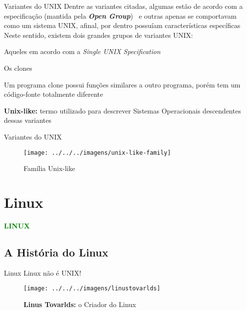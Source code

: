 \documentclass{beamer}
\begin{document}
    \begin{frame}[t]{Variantes do UNIX}
      Dentre as variantes citadas, algumas estão de acordo com a especificação (mantida pela \textbf{\textit{Open Group}}) \
      e outras apenas se comportavam como um sistema UNIX, afinal, por dentro possuíam características específicas \\
      \vspace{\baselineskip}
      \uncover<2->
      {Neste sentido, existem dois grandes grupos de variantes UNIX:}
      \begin{itemize}
        {\item Aqueles em acordo com a \textit{Single UNIX Specification}}
	\uncover<4->
	{\item Os clones}
	\begin{itemize}
	  \vspace{\baselineskip}
	  {\item Um programa clone possui funções similares a outro programa, porém tem um código-fonte totalmente diferente}
	\end{itemize}
      \end{itemize}
      \vspace{\baselineskip}
      {\textbf{Unix-like:} termo utilizado para descrever Sistemas Operacionais descendentes dessas variantes}
   \end{frame}

   \begin{frame}[t]{Variantes do UNIX}
      \begin{figure}
	\texttt{[image: ../../../imagens/unix-like-family]}
	\caption{Família Unix-like} 
      \end{figure}
   \end{frame}

\section{Linux}
  \begin{frame}
     \begin{center}
        \Large{\textcolor{green}{\textbf{LINUX}}}
     \end{center}
   \end{frame}
  \subsection{A História do Linux}
   \begin{frame}{Linux}
      \alert{Li}nux \alert{n}ão é \alert{U}NI\alert{X}!
      \centering
      \begin{figure}
	\texttt{[image: ../../../imagens/linustovarlds]}
	\caption{\textbf{Linus Tovarlds:} o Criador do Linux} 
      \end{figure}
   \end{frame}
\end{document}
